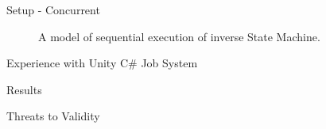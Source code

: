\begin{frame}{\secname}{\subsecname}
	Setup - Concurrent
	\begin{figure}[h!]
        \centering
        
        \caption{A model of sequential execution of inverse State Machine.}
    \end{figure}
\end{frame}

\begin{frame}{\secname}{\subsecname}
	Experience with Unity C\# Job System
\end{frame}

\begin{frame}{\secname}{\subsecname}
	Results
\end{frame}

\begin{frame}{\secname}{\subsecname}
	Threats to Validity
\end{frame}